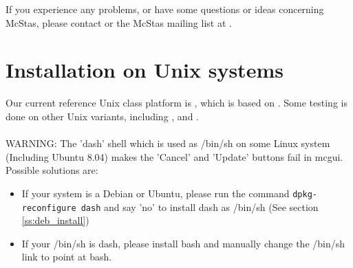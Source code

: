 \noindent If you experience any problems, or have some questions or ideas
concerning McStas, please contact
or the McStas mailing list at .


\section{Installation on Unix systems}
\label{s:unix_install}
Our current reference Unix class platform is
, which is
based on . Some testing is done on other
Unix variants, including ,
and .
\ \\\ \\
 WARNING: The 'dash' shell which is used as /bin/sh on some Linux system (Including Ubuntu 8.04) makes the 'Cancel' and 'Update'
  buttons fail in mcgui. Possible solutions are:
\begin{itemize}
 \item If your system is a Debian or Ubuntu, please run the command
   \verb+dpkg-reconfigure dash+ and say 'no' to install dash as /bin/sh  (See section \ref{ss:deb_install})
 \item If your /bin/sh is dash, please install bash and manually change the /bin/sh link to point at bash.
\end{itemize}

